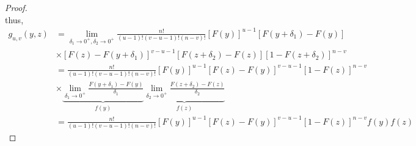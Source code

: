\begin{proof}
\begin{equation*}
    \end{equation*}
    thus,
    \begin{align*}
        g_{u,v}(y,z) & = \lim_{\delta_1\to0^+,\delta_2\to0^+}\frac{n!}{(u-1)!(v-u-1)!(n-v)!}[F(y)]^{u-1}[F(y+\delta_1)-F(y)]\\
        & \times [F(z)-F(y+\delta_1)]^{v-u-1}[F(z+\delta_2)-F(z)][1-F(z+\delta_2)]^{n-v}\\
        & = \frac{n!}{(u-1)!(v-u-1)!(n-v)!}[F(y)]^{u-1}[F(z)-F(y)]^{v-u-1}[1-F(z)]^{n-v}\\
        & \times \underbrace{\lim_{\delta_1\to0^+}\frac{F(y+\delta_1)-F(y)}{\delta_1}}_{f(y)}\underbrace{\lim_{\delta_2\to0^+}\frac{F(z+\delta_2)-F(z)}{\delta_2}}_{f(z)}\\
        & = \frac{n!}{(u-1)!(v-u-1)!(n-v)!}[F(y)]^{u-1}[F(z)-F(y)]^{v-u-1}[1-F(z)]^{n-v}f(y)f(z)
    \end{align*}
\end{proof}

